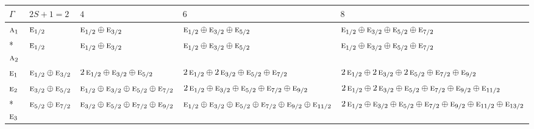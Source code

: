 \documentclass[10pt,a4paper]{article}
\numberwithin{equation}{section}
\newcommand{\irr}[1]{\text{\normalfont\scshape #1}}
\begin{document}
{\small\setlength{\tabcolsep}{3pt}\begin{longtable}{@{}l>{\RaggedRight\arraybackslash}p{}>{\RaggedRight\arraybackslash}p{}>{\RaggedRight\arraybackslash}p{}>{\RaggedRight\arraybackslash}p{}@{}}\toprule
$\Gamma$ & $2S + 1 = 2$ & $4$ & $6$ & $8$\\\midrule\endhead
\bottomrule\endfoot\endlastfoot
$\irr{a}_{1}$ & $\irr{e}_{1/2}$ & $\irr{e}_{1/2}\oplus \irr{e}_{3/2}$ & $\irr{e}_{1/2}\oplus \irr{e}_{3/2}\oplus \irr{e}_{5/2}$ & $\irr{e}_{1/2}\oplus \irr{e}_{3/2}\oplus \irr{e}_{5/2}\oplus \irr{e}_{7/2}$\\*
$\irr{a}_{2}$ & $\irr{e}_{1/2}$ & $\irr{e}_{1/2}\oplus \irr{e}_{3/2}$ & $\irr{e}_{1/2}\oplus \irr{e}_{3/2}\oplus \irr{e}_{5/2}$ & $\irr{e}_{1/2}\oplus \irr{e}_{3/2}\oplus \irr{e}_{5/2}\oplus \irr{e}_{7/2}$\\
$\irr{e}_{1}$ & $\irr{e}_{1/2}\oplus \irr{e}_{3/2}$ & $2\,\irr{e}_{1/2}\oplus \irr{e}_{3/2}\oplus \irr{e}_{5/2}$ & $2\,\irr{e}_{1/2}\oplus 2\,\irr{e}_{3/2}\oplus \irr{e}_{5/2}\oplus \irr{e}_{7/2}$ & $2\,\irr{e}_{1/2}\oplus 2\,\irr{e}_{3/2}\oplus 2\,\irr{e}_{5/2}\oplus \irr{e}_{7/2}\oplus \irr{e}_{9/2}$\\
$\irr{e}_{2}$ & $\irr{e}_{3/2}\oplus \irr{e}_{5/2}$ & $\irr{e}_{1/2}\oplus \irr{e}_{3/2}\oplus \irr{e}_{5/2}\oplus \irr{e}_{7/2}$ & $2\,\irr{e}_{1/2}\oplus \irr{e}_{3/2}\oplus \irr{e}_{5/2}\oplus \irr{e}_{7/2}\oplus \irr{e}_{9/2}$ & $2\,\irr{e}_{1/2}\oplus 2\,\irr{e}_{3/2}\oplus \irr{e}_{5/2}\oplus \irr{e}_{7/2}\oplus \irr{e}_{9/2}\oplus \irr{e}_{11/2}$\\*
$\irr{e}_{3}$ & $\irr{e}_{5/2}\oplus \irr{e}_{7/2}$ & $\irr{e}_{3/2}\oplus \irr{e}_{5/2}\oplus \irr{e}_{7/2}\oplus \irr{e}_{9/2}$ & $\irr{e}_{1/2}\oplus \irr{e}_{3/2}\oplus \irr{e}_{5/2}\oplus \irr{e}_{7/2}\oplus \irr{e}_{9/2}\oplus \irr{e}_{11/2}$ & $2\,\irr{e}_{1/2}\oplus \irr{e}_{3/2}\oplus \irr{e}_{5/2}\oplus \irr{e}_{7/2}\oplus \irr{e}_{9/2}\oplus \irr{e}_{11/2}\oplus \irr{e}_{13/2}$\\
\bottomrule\end{longtable}}
\end{document}
